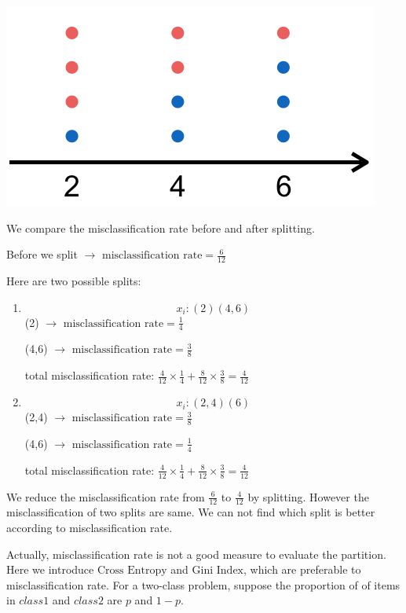 \documentclass{article}
\begin{document}
 \begin{center}
 	\includegraphics[scale=0.65]{images/numerical.png}
 
 \end{center}  
We compare the misclassification rate before and after splitting.

Before we split  $\rightarrow$ \(\text{misclassification rate}=\frac{6}{12}\)

Here are two possible splits:

\begin{enumerate}
	\item  \[x_i:(2)(4,6)\]
	(2) $\rightarrow$ \(\text{misclassification rate}=\frac{1}{4}\)
	
	(4,6) $\rightarrow$ \(\text{misclassification rate}=\frac{3}{8}\)
	
	total misclassification rate: \(\frac{4}{12}\times\frac{1}{4}+\frac{8}{12}\times\frac{3}{8}=\frac{4}{12}\)
	
	\item  \[x_i:(2,4)(6)\] 
	(2,4) $\rightarrow$ \(\text{misclassification rate}=\frac{3}{8}\)
	
	(4,6) $\rightarrow$ \(\text{misclassification rate}=\frac{1}{4}\)
	
	total misclassification rate: \(\frac{4}{12}\times\frac{1}{4}+\frac{8}{12}\times\frac{3}{8}=\frac{4}{12}\)
\end{enumerate}

We reduce the misclassification rate from $\frac{6}{12}$ to $\frac{4}{12}$ by splitting. However the misclassification of two splits are same. We can not find which split is better according to misclassification rate. 

Actually, misclassification rate is not a good measure to evaluate the partition. Here we introduce $\text{Cross Entropy}$ and $\text{Gini Index}$, which are preferable to misclassification rate. 
For a two-class problem, suppose the proportion of of items in $class1$ and $class2$ are $p$ and $1-p$. 
\end{document}

